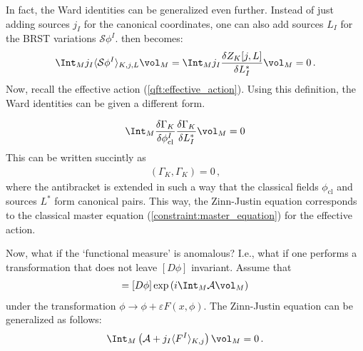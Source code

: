     In fact, the Ward identities can be generalized even further. Instead of just adding sources $j_I$ for the canonical coordinates, one can also add sources $L_I$ for the BRST variations $\mathcal{S}\phi^I$.  then becomes:
    \begin{gather}
        \Int_Mj_I\langle\mathcal{S}\phi^I\rangle_{K,j,L}\vol_M = \Int_Mj_I\frac{\delta Z_K[j,L]}{\delta L^*_I}\vol_M=0\,.
    \end{gather}
    Now, recall the effective action (\cref{qft:effective_action}). Using this definition, the Ward identities can be given a different form.
    \begin{property}
        \begin{gather}
            \Int_M\frac{\delta\Gamma_K}{\delta\phi^I_{\text{cl}}}\frac{\delta\Gamma_K}{\delta L^*_I}\vol_M=0
        \end{gather}
        This can be written succintly as
        \begin{gather}
            (\Gamma_K,\Gamma_K)=0\,,
        \end{gather}
        where the antibracket is extended in such a way that the classical fields $\phi_{\text{cl}}$ and sources $L^*$ form canonical pairs. This way, the Zinn-Justin equation corresponds to the classical master equation (\cref{constraint:master_equation}) for the effective action.
    \end{property}

    \begin{property}
        Now, what if the `functional measure' is anomalous? I.e., what if one performs a transformation that does not leave $[D\phi]$ invariant. Assume that
        \begin{gather}
            [D\phi'] = [D\phi]\exp\left(i\Int_M\mathcal{A}\vol_M\right)
        \end{gather}
        under the transformation $\phi\longrightarrow\phi+\varepsilon F(x,\phi)$. The Zinn-Justin equation can be generalized as follows:
        \begin{gather}
            \Int_M\left(\mathcal{A}+j_I\langle F^I\rangle_{K,j}\right)\vol_M=0\,.
        \end{gather}
    \end{property}

